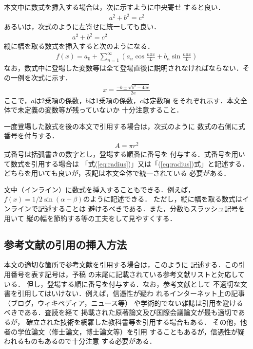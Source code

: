 \documentclass[a4j]{jsarticle}
\begin{document}
本文中に数式を挿入する場合は，次に示すように中央寄せ
すると良い．
\begin{align}
\nonumber  a^2 + b^2 = c^2
\end{align}
あるいは，次式のように左寄せに統一しても良い．
\begin{align}
\nonumber a^2 + b^2 = c^2~~~~~~~~~~~~~~~~~~~~~~~~~~~~~~~~~~~~~~~~~~~~~~~~~
\end{align}
縦に幅を取る数式を挿入すると次のようになる．
\begin{align}
\nonumber  f(x) = a_0 + \sum_{n=1}^{\infty} \left( a_n \cos \frac{ n\pi x }{ L } + b_n\sin \frac{ n\pi x }{ L } \right)
\end{align}
なお，数式中に登場した変数等は全て登場直後に説明されなければならない．その一例を次式に示す．
\begin{align}
\nonumber  x = \frac{ -b \pm \sqrt{ b^2 -4ac } }{ 2a }
\end{align}
ここで，$a$は2乗項の係数，$b$は1乗項の係数，$c$は定数項
をそれぞれ示す．本文全体で未定義の変数等が残っていないか
十分注意すること．

一度登場した数式を後の本文で引用する場合は，次式のように
数式の右側に式番号を付与する．
\begin{align}
  A = \pi r^2 \label{eq:radius}
\end{align}
式番号は括弧書きの数字とし，登場する順番に番号を
付与する．式番号を用いて数式を引用する場合は
「式(\ref{eq:radius})」又は「(\ref{eq:radius})式」と記述する．
どちらを用いても良いが，表記は本文全体で統一されている
必要がある．

文中（インライン）に数式を挿入することもできる．例えば，
$f(x) = 1/2 \sin(\alpha + \beta)$のように記述できる．
ただし，縦に幅を取る数式はインラインで記述することは
避けるべきである．また，分数もスラッシュ記号を用いて
縦の幅を節約する等の工夫をして見やすくする．

\subsection{参考文献の引用の挿入方法}

本文の適切な箇所で参考文献を引用する場合は，このように
記述する\cite{sample1}．この引用番号を表す記号は，予稿
の末尾に記載されている参考文献リストと対応している\cite{sample2}．
但し，登場する順に番号を付与する．なお，参考文献として
不適切な文書を引用してはいけない．例えば，信憑性が疑わ
れるインターネット上の記事（ブログ，ウィキペディア，ニュース等）
や学術的でない雑誌は引用を避けるべきである．査読を経て
掲載された原著論文及び国際会議論文が最も適切であるが，
確立された技術を網羅した教科書等を引用する場合もある．
その他，他者の学位論文（修士論文，博士論文等）を引用
することもあるが，信憑性が疑われるものもあるので十分注意
する必要がある．
\end{document}
